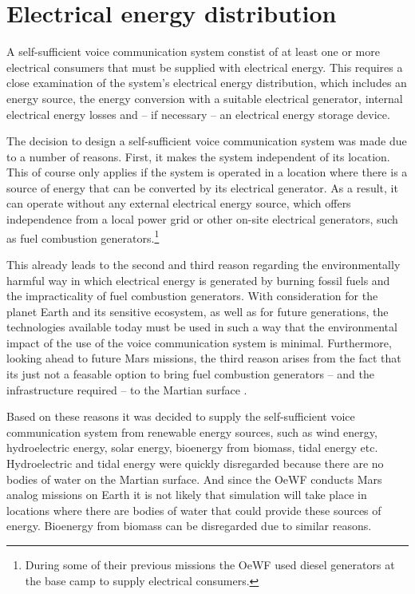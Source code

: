 \section{Electrical energy distribution} \label{sec:methodology}
A self-sufficient voice communication system constist of at least one or more electrical consumers that must be supplied with electrical energy. This requires a close examination of the system's electrical energy distribution, which includes an energy source, the energy conversion with a suitable electrical generator, internal electrical energy losses and -- if necessary -- an electrical energy storage device.

The decision to design a self-sufficient voice communication system was made due to a number of reasons. First, it makes the system independent of its location. This of course only applies if the system is operated in a location where there is a source of energy that can be converted by its electrical generator. As a result, it can operate without any external electrical energy source, which offers independence from a local power grid or other on-site electrical generators, such as fuel combustion generators.\footnote{During some of their previous missions the OeWF used diesel generators at the base camp to supply electrical consumers.} 

This already leads to the second and third reason regarding the environmentally harmful way in which electrical energy is generated by burning fossil fuels and the impracticality of fuel combustion generators. With consideration for the planet Earth and its sensitive ecosystem, as well as for future generations, the technologies available today must be used in such a way that the environmental impact of the use of the voice communication system is minimal. Furthermore, looking ahead to future Mars missions, the third reason arises from the fact that its just not a feasable option to bring fuel combustion generators -- and the infrastructure required -- to the Martian surface \cite{Bertol:2011, Mertens:2015}.  

Based on these reasons it was decided to supply the self-sufficient voice communication system from renewable energy sources, such as wind energy, hydroelectric energy, solar energy, bioenergy from biomass, tidal energy etc. Hydroelectric and tidal energy were quickly disregarded because there are no bodies of water on the Martian surface. And since the OeWF conducts Mars analog missions on Earth it is not likely that simulation will take place in locations where there are bodies of water that could provide these sources of energy. Bioenergy from biomass can be disregarded due to similar reasons. 
